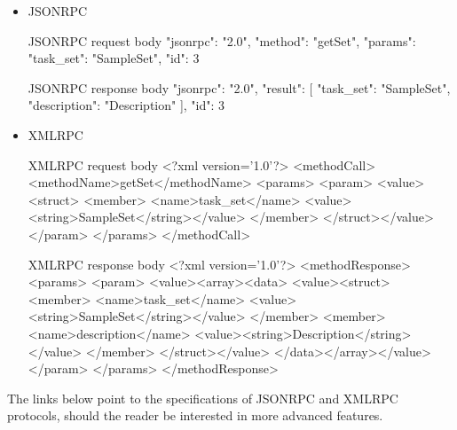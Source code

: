 \newpage
\begin{itemize}
    \item 
        JSONRPC
        \begin{sexylisting}[colback=white]{JSONRPC request body}
{
    "jsonrpc": "2.0", 
    "method": "getSet", 
    "params": {"task_set": "SampleSet"}, 
    "id": 3
}
        \end{sexylisting}
        \begin{sexylisting}[colback=white]{JSONRPC response body}
{
    "jsonrpc": "2.0",
    "result":
        [
            {
                "task_set": "SampleSet", 
                "description": "Description"
            }       
        ],
    "id": 3
}
        \end{sexylisting}
    \item
        XMLRPC
        \begin{sexylisting}[colback=white]{XMLRPC request body}
<?xml version='1.0'?> 
<methodCall>
    <methodName>getSet</methodName>\n 
    <params>
    <param>
        <value><struct>
        <member>
            <name>task_set</name>
            <value><string>SampleSet</string></value>
        </member>
        </struct></value>
    </param>
    </params>
</methodCall>
        \end{sexylisting}
        \begin{sexylisting}[colback=white]{XMLRPC response body}
<?xml version='1.0'?>
<methodResponse>
    <params>
    <param>
        <value><array><data>
        <value><struct>
        <member>
            <name>task_set</name>
            <value><string>SampleSet</string></value>
        </member>
        <member>
            <name>description</name>
            <value><string>Description</string></value>
        </member>
        </struct></value>
        </data></array></value>
    </param>
    </params>
</methodResponse>
        \end{sexylisting}
\end{itemize}

\noindent
The links below point to the specifications of JSONRPC and XMLRPC protocols, should the reader be interested in more advanced features.
\newline

\noindent{}
\newline

\noindent{}

